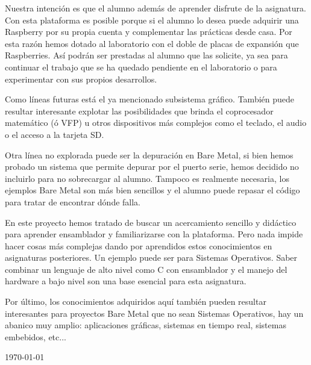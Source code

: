 Nuestra intención es que el alumno además de aprender disfrute de la
asignatura. Con esta plataforma es posible porque si el alumno lo desea
puede adquirir una Raspberry por su propia cuenta y complementar las
prácticas desde casa. Por esta razón hemos dotado al
laboratorio con el doble de placas de expansión que Raspberries. Así
podrán ser prestadas al alumno que las solicite, ya sea para continuar
el trabajo que se ha quedado pendiente en el laboratorio o para
experimentar con sus propios desarrollos.

Como líneas futuras está el ya mencionado subsistema gráfico. También puede
resultar interesante explotar las posibilidades que brinda el coprocesador
matemático (ó VFP) u otros dispositivos más complejos como el teclado,
el audio o el acceso a la tarjeta SD.

Otra línea no explorada puede ser la depuración en Bare Metal, si bien hemos
probado un sistema que permite depurar por el puerto serie, hemos decidido
no incluirlo para no sobrecargar al alumno. Tampoco es realmente necesaria,
los ejemplos Bare Metal son más bien sencillos y el alumno puede repasar
el código para tratar de encontrar dónde falla.

En este proyecto hemos tratado de buscar un acercamiento sencillo y didáctico
para aprender ensamblador y familiarizarse con la plataforma. Pero nada impide
hacer cosas más complejas dando por aprendidos estos conocimientos en
asignaturas posteriores. Un ejemplo puede ser para Sistemas Operativos. Saber
combinar un lenguaje de alto nivel como C con ensamblador y el manejo del
hardware a bajo nivel son una base esencial para esta asignatura.

Por último, los conocimientos adquiridos aquí también pueden resultar
interesantes para proyectos Bare Metal que no sean Sistemas Operativos, hay un
abanico muy amplio: aplicaciones gráficas, sistemas en tiempo real,
sistemas embebidos, etc...

\begin{flushright}
{\large \pfcauthorname}\nli
\today
\end{flushright}
  
\chapterend
